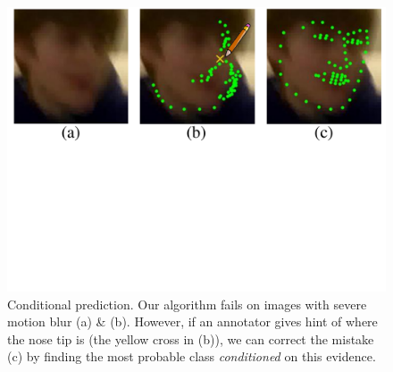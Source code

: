\documentclass[letterpaper]{article} %
\begin{document}

\begin{figure}[t]
\begin{center}
   \includegraphics[width=1\linewidth]{fig/CondPred.pdf}
\end{center}
   \caption{Conditional prediction. Our algorithm fails on images with severe motion blur (a) \& (b).  However, if an annotator gives hint of where the nose tip is (the yellow cross in (b)), we can correct the mistake (c) by finding the most probable class {\em conditioned} on this evidence.}
\label{fig:condpred}
\end{figure}
\end{document}
